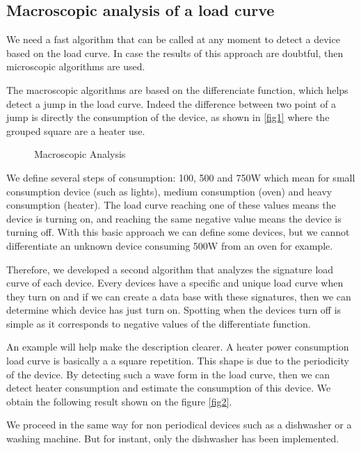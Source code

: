 \subsection{Macroscopic analysis of a load curve}
We need a fast algorithm that can be called at any moment to detect a device based on the load curve. In case the results of this approach are doubtful, then microscopic algorithms are used.

The macroscopic algorithms are based on the differenciate function, which helps detect a jump in the load curve. Indeed the difference between two point of a jump is directly the consumption of the device, as shown in \ref{fig1} where the grouped square are a heater use.


\begin{figure}[h]
 \begin{center}
   \caption{Macroscopic Analysis}
   \label{fig-1-1-2}
 \end{center}
\end{figure}

We define several steps of consumption: 100, 500 and 750W which mean for small consumption device (such as lights), medium consumption (oven) and heavy consumption (heater). The load curve reaching one of these values means the device is turning on, and reaching the same negative value means the device is turning off. With this basic approach we can define some devices, but we cannot differentiate an unknown device consuming 500W from an oven for example.

Therefore, we developed a second algorithm that analyzes the signature load curve of each device. Every devices have a specific and unique load curve when they turn on and if we can create a data base with these signatures, then we can determine which device has just turn on. Spotting when the devices turn off is simple as it corresponds to negative values of the differentiate function.

An example will help make the description clearer. A heater power consumption load curve is basically a a square repetition. This shape is due to the periodicity of the device. By detecting such a wave form in the load curve, then we can detect heater consumption and estimate the consumption of this device. We obtain the following result shown on the figure \ref{fig2}.




We proceed in the same way for non periodical devices such as a dishwasher or a washing machine. But for instant, only the dishwasher has been implemented.


